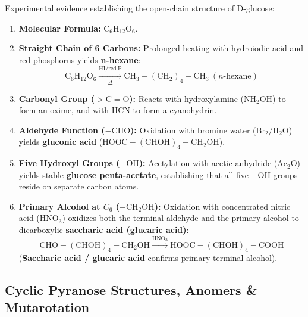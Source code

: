 \documentclass[10pt,twoside,openright]{book}
\begin{document}
\begin{formulabox}
Experimental evidence establishing the open-chain structure of D-glucose:
\begin{enumerate}[leftmargin=*]
  \item \textbf{Molecular Formula:} $\mathrm{C_6H_{12}O_6}$.
  \item \textbf{Straight Chain of 6 Carbons:} Prolonged heating with hydroiodic acid and red phosphorus yields \textbf{n-hexane}:
  \begin{equation}
    \mathrm{C_6H_{12}O_6} \xrightarrow[\Delta]{\mathrm{HI / red\ P}} \mathrm{CH_3-(CH_2)_4-CH_3} \ (n\text{-hexane})
  \end{equation}
  \item \textbf{Carbonyl Group ($>\mathrm{C=O}$):} Reacts with hydroxylamine ($\mathrm{NH_2OH}$) to form an oxime, and with $\mathrm{HCN}$ to form a cyanohydrin.
  \item \textbf{Aldehyde Function ($-\mathrm{CHO}$):} Oxidation with bromine water ($\mathrm{Br_2 / H_2O}$) yields \textbf{gluconic acid} ($\mathrm{HOOC-(CHOH)_4-CH_2OH}$).
  \item \textbf{Five Hydroxyl Groups ($-\mathrm{OH}$):} Acetylation with acetic anhydride ($\mathrm{Ac_2O}$) yields stable \textbf{glucose penta-acetate}, establishing that all five $-\mathrm{OH}$ groups reside on separate carbon atoms.
  \item \textbf{Primary Alcohol at $C_6$ ($-\mathrm{CH_2OH}$):} Oxidation with concentrated nitric acid ($\mathrm{HNO_3}$) oxidizes both the terminal aldehyde and the primary alcohol to dicarboxylic \textbf{saccharic acid (glucaric acid)}:
  \begin{equation}
    \mathrm{CHO-(CHOH)_4-CH_2OH} \xrightarrow{\mathrm{HNO_3}} \mathbf{\mathrm{HOOC-(CHOH)_4-COOH}}
  \end{equation}
  (\textbf{Saccharic acid / glucaric acid} confirms primary terminal alcohol).
\end{enumerate}
\end{formulabox}

\subsection{Cyclic Pyranose Structures, Anomers \& Mutarotation}
\end{document}
